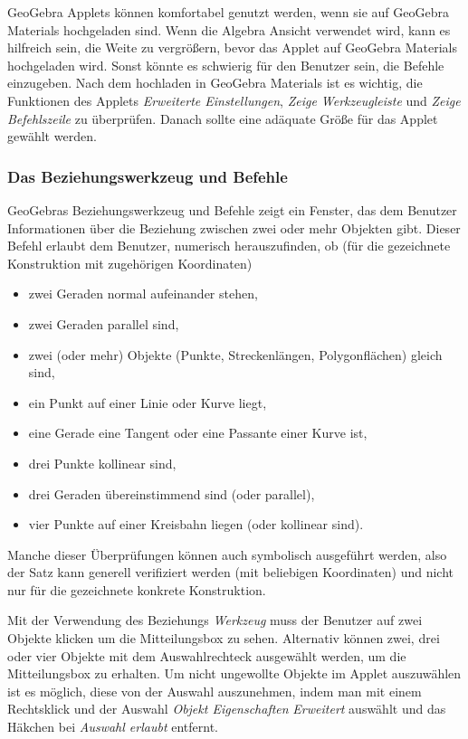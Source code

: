 \documentclass{article}
\begin{document}
GeoGebra Applets können komfortabel genutzt werden, wenn sie auf GeoGebra Materials hochgeladen  sind.
Wenn die Algebra Ansicht verwendet wird, kann es hilfreich sein, die Weite zu vergrößern, bevor das Applet auf GeoGebra Materials hochgeladen wird. Sonst könnte es schwierig für den Benutzer sein, die Befehle einzugeben. Nach dem hochladen in GeoGebra Materials ist es wichtig, die Funktionen des Applets  \textit{Erweiterte Einstellungen},  \textit{Zeige Werkzeugleiste} und \textit{Zeige Befehlszeile} zu überprüfen. Danach sollte eine adäquate Größe für das Applet gewählt werden.


\subsubsection{Das Beziehungswerkzeug und Befehle}

GeoGebras Beziehungswerkzeug und Befehle zeigt ein Fenster, das dem Benutzer Informationen über die Beziehung zwischen zwei oder mehr Objekten gibt.
Dieser Befehl erlaubt dem Benutzer, numerisch herauszufinden, ob (für die gezeichnete Konstruktion mit zugehörigen Koordinaten)
\begin{itemize}
    \item zwei Geraden normal aufeinander stehen,
    \item zwei Geraden parallel sind,
    \item zwei (oder mehr) Objekte (Punkte, Streckenlängen, Polygonflächen) gleich sind,
    \item ein Punkt auf einer Linie oder Kurve liegt,
    \item eine Gerade eine Tangent oder eine Passante einer Kurve ist,
    \item drei Punkte kollinear sind,
    \item drei Geraden übereinstimmend sind (oder parallel),
    \item vier Punkte auf einer Kreisbahn liegen (oder kollinear sind).
\end{itemize}
Manche dieser Überprüfungen können auch symbolisch ausgeführt werden, also der Satz kann generell verifiziert werden (mit beliebigen Koordinaten) und nicht nur für die gezeichnete konkrete Konstruktion.

Mit der Verwendung des Beziehungs \textit{Werkzeug} muss der Benutzer auf zwei Objekte klicken um die Mitteilungsbox zu sehen. Alternativ können zwei, drei oder vier Objekte mit dem Auswahlrechteck ausgewählt werden, um die Mitteilungsbox zu erhalten. Um nicht ungewollte Objekte im Applet auszuwählen ist es möglich, diese von der Auswahl auszunehmen, indem man mit einem Rechtsklick und der Auswahl \textit{Objekt Eigenschaften} \textit{Erweitert} auswählt und das Häkchen bei \textit{Auswahl erlaubt} entfernt.
\end{document}
